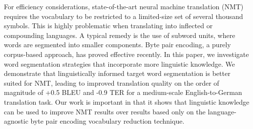 For efficiency considerations, state-of-the-art neural machine translation (NMT) requires the vocabulary to be restricted to a limited-size set of several thousand symbols. This is highly problematic when translating into inflected or compounding languages. A typical remedy is the use of subword units, where words are segmented into smaller components. Byte pair encoding, a purely corpus-based approach, has proved effective recently. In this paper, we investigate word segmentation strategies that incorporate more linguistic knowledge. We demonstrate that linguistically informed target word segmentation is better suited for NMT, leading to improved translation quality on the order of magnitude of +0.5 BLEU and -0.9 TER for a medium-scale English-to-German translation task. Our work is important in that it shows that linguistic knowledge can be used to improve NMT results over results based only on the language-agnostic byte pair encoding vocabulary reduction technique.
